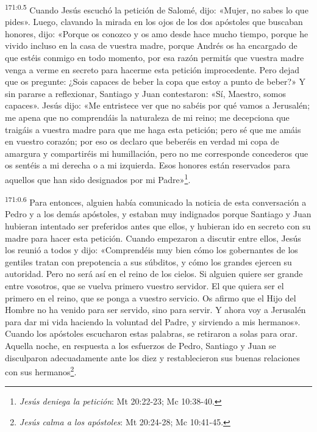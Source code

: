 \par
\textsuperscript{171:0.5} Cuando Jesús escuchó la petición de Salomé, dijo: «Mujer, no sabes lo que pides». Luego, clavando la mirada en los ojos de los dos apóstoles que buscaban honores, dijo: «Porque os conozco y os amo desde hace mucho tiempo, porque he vivido incluso en la casa de vuestra madre, porque Andrés os ha encargado de que estéis conmigo en todo momento, por esa razón permitís que vuestra madre venga a verme en secreto para hacerme esta petición improcedente. Pero dejad que os pregunte: ¿Sois capaces de beber la copa que estoy a punto de beber?» Y sin pararse a reflexionar, Santiago y Juan contestaron: «Sí, Maestro, somos capaces». Jesús dijo: «Me entristece ver que no sabéis por qué vamos a Jerusalén; me apena que no comprendáis la naturaleza de mi reino; me decepciona que traigáis a vuestra madre para que me haga esta petición; pero sé que me amáis en vuestro corazón; por eso os declaro que beberéis en verdad mi copa de amargura y compartiréis mi humillación, pero no me corresponde concederos que os sentéis a mi derecha o a mi izquierda. Esos honores están reservados para aquellos que han sido designados por mi Padre»\footnote{\textit{Jesús deniega la petición}: Mt 20:22-23; Mc 10:38-40.}.

\par
\textsuperscript{171:0.6} Para entonces, alguien había comunicado la noticia de esta conversación a Pedro y a los demás apóstoles, y estaban muy indignados porque Santiago y Juan hubieran intentado ser preferidos antes que ellos, y hubieran ido en secreto con su madre para hacer esta petición. Cuando empezaron a discutir entre ellos, Jesús los reunió a todos y dijo: «Comprendéis muy bien cómo los gobernantes de los gentiles tratan con prepotencia a sus súbditos, y cómo los grandes ejercen su autoridad. Pero no será así en el reino de los cielos. Si alguien quiere ser grande entre vosotros, que se vuelva primero vuestro servidor. El que quiera ser el primero en el reino, que se ponga a vuestro servicio. Os afirmo que el Hijo del Hombre no ha venido para ser servido, sino para servir. Y ahora voy a Jerusalén para dar mi vida haciendo la voluntad del Padre, y sirviendo a mis hermanos». Cuando los apóstoles escucharon estas palabras, se retiraron a solas para orar. Aquella noche, en respuesta a los esfuerzos de Pedro, Santiago y Juan se disculparon adecuadamente ante los diez y restablecieron sus buenas relaciones con sus hermanos\footnote{\textit{Jesús calma a los apóstoles}: Mt 20:24-28; Mc 10:41-45.}.

